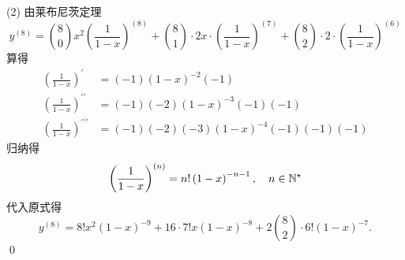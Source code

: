 (2) \solve 由莱布尼茨定理
\begin{equation}
    y^{(8)} = \binom{8}{0} x^2 \left(\frac{1}{1-x}\right)^{(8)} + \binom{8}{1} \cdot 2x \cdot \left(\frac{1}{1-x}\right)^{(7)} + \binom{8}{2} \cdot 2 \cdot \left(\frac{1}{1-x}\right)^{(6)} 
\end{equation}
算得
\begin{align}
    \left(\frac{1}{1-x}\right)^\prime &= \left(-1\right)\left(1-x\right)^{-2}(-1) \\
    \left(\frac{1}{1-x}\right)^{\prime\prime} &= (-1)(-2)\left(1-x\right)^{-3}(-1)(-1) \\
    \left(\frac{1}{1-x}\right)^{\prime\prime\prime} &= (-1)(-2)(-3)\left(1-x\right)^{-4}(-1)(-1)(-1)
\end{align}
归纳得
\begin{equation}
    \left(\frac{1}{1-x}\right)^{(n)} = n! \left(1-x\right)^{-n-1}, \quad n \in \mathbb{N}^\star
\end{equation}
代入原式得
\begin{equation}
    y^{(8)} = 8! x^2 (1-x)^{-9} + 16 \cdot 7! x \left(1-x\right)^{-8} + 2 \binom{8}{2} \cdot 6! \left(1-x\right)^{-7}.
\end{equation}
\qed\bigskip